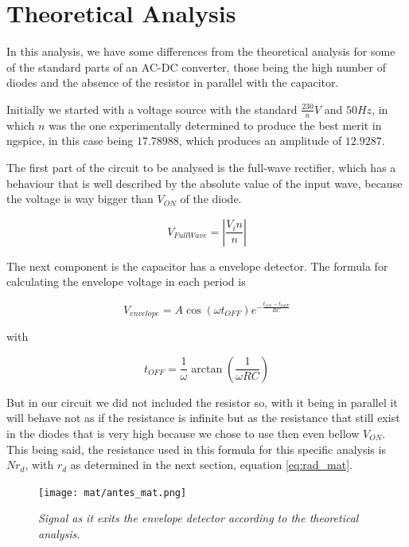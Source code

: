 \section{Theoretical Analysis}

In this analysis, we have some differences from the theoretical analysis for some of the standard parts of an AC-DC converter, those being the high number of diodes and the absence of the resistor in parallel with the capacitor.

Initially we started with a voltage source with the standard $\frac{230}{n}V$ and $50Hz$, in which $n$ was the one experimentally determined to produce the best merit in ngspice, in this case being $17.78988$, which produces an amplitude of $12.9287$.

The first part of the circuit to be analysed is the full-wave rectifier, which has a behaviour that is well described by the absolute value of the input wave, because the voltage is way bigger than $V_{ON}$ of the diode.

\begin{equation}
    V_{Full Wave} = \left|\frac{V_in}{n}\right|
    \label{eq:fullwave_mat}
\end{equation}

The next component is the capacitor has a envelope detector. The formula for calculating the envelope voltage in each period is 

\begin{equation}
    V_{envelope}=A\cos{(\omega t_{OFF})}e^{-\frac{t_{ON}-t_{OFF}}{RC}}
\end{equation}

with 

\begin{equation}
    t_{OFF}=\frac{1}{\omega}\arctan\left(\frac{1}{\omega R C}\right)
\end{equation}

But in our circuit we did not included the resistor so, with it being in parallel it will behave not as if the resistance is infinite but as the resistance that still exist in the diodes that is very high because we chose to use then even bellow $V_{ON}$. This being said, the resistance used in this formula for this specific analysis is $N r_d$, with $r_d$ as determined in the next section, equation \eqref{eq:rad_mat}.

\begin{figure}[H]
    \centering
    \texttt{[image: mat/antes\_mat.png]}
        \caption{\textit{Signal as it exits the envelope detector according to the theoretical analysis.}}
    \label{fig:plot}
\end{figure}

